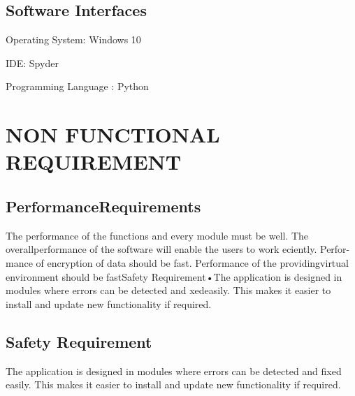 \documentclass[oneside,a4paper,12pt]{report}
\begin{document}
 \subsection {Software Interfaces}
\item  Operating System: Windows 10\\
\item IDE: Spyder\\
\item Programming Language : Python\\

\section {NON FUNCTIONAL REQUIREMENT}
\subsection {PerformanceRequirements}
\item The performance of the functions and every module must be well. The overallperformance of the software will enable the users to work eciently.  Perfor-mance  of  encryption  of  data  should  be  fast.   Performance  of  the  providingvirtual environment should be fastSafety Requirement•The application is designed in modules where errors can be detected and xedeasily. This makes it easier to install and update new functionality if required.\\
 \subsection {Safety Requirement}
 \item The application is designed in modules where errors can be detected and fixed easily. This makes it easier to install and update new functionality if required.\\
 
\end{document}
